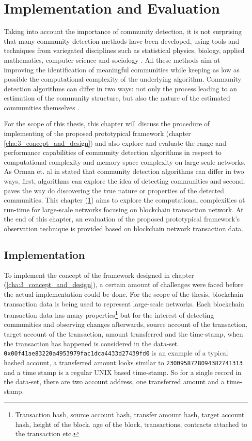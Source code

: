 \chapter{Implementation and Evaluation}\label{cha:4_implementation_and_evaluation}
Taking into account the importance of community detection, it is not surprising that many community detection methods have been developed, using tools and techniques from variegated disciplines such as statistical physics, biology, applied mathematics, computer science and sociology \cite{ref-49}. All these methods aim at improving the identification of meaningful communities while keeping as low as possible the computational complexity of the underlying algorithm. Community detection algorithms can differ in two ways: not only the process leading to an estimation of the community structure, but also the nature of the estimated communities themselves \cite{ref-50}. 

For the scope of this thesis, this chapter will discuss the procedure of implementing of the proposed prototypical framework (chapter \ref{cha:3_concept_and_design}) and also explore and evaluate the range and performance capabilities of community detection algorithms in respect to computational complexity and memory space complexity on large scale networks. As Orman et. al in \cite{ref-50} stated that community detection algorithms can differ in two ways, first, algorithms can explore the idea of detecting communities and second, paves the way do discovering the true nature or properties of the detected communities. This chapter (\ref{cha:4_implementation_and_evaluation}) aims to explore the computational complexities at run-time for large-scale networks focusing on blockchain transaction network. At the end of this chapter, an evaluation of the proposed prototypical framework's observation technique is provided based on blockchain network transaction data.

\section{Implementation}
To implement the concept of the framework designed in chapter (\ref{cha:3_concept_and_design}), a certain amount of challenges were faced before the actual implementation could be done. For the scope of the thesis, blockchain transaction data is being used to represent large-scale networks. Each blockchain transaction data has many properties\footnote{Transaction hash, source account hash, transfer amount hash, target account hash, height of the block, age of the block, transactions, contracts attached to the transaction etc.} but for the interest of detecting communities and observing changes afterwards, source account of the transaction, target account of the transaction, amount transferred and the time-stamp, when the transaction has happened is considered in the data-set. \texttt{0x00f41ae83220a4953979fac1dca4433d27439fd0} is an example of a typical hashed account, a transferred amount looks similar to \texttt{2300958728094382741313} and a time stamp is a regular UNIX based time-stamp. So for a single record in the data-set, there are two account address, one transferred amount and a time-stamp.

